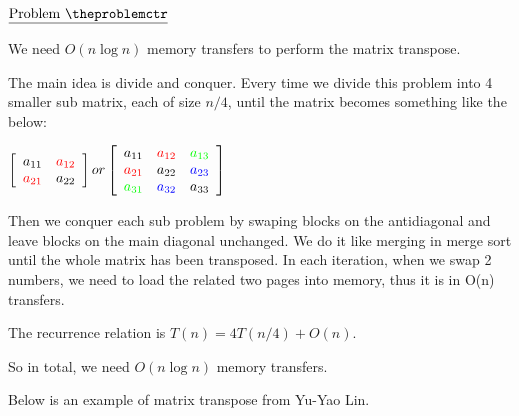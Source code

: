 \documentclass[11pt]{article}
\def\pp{\par\noindent}
\begin{document}
\vfill
\newpage
\addtocounter{problemctr}{1}
\bigskip
\noindent
$\underline{\rm Problem\ \theproblemctr}$\pp

We need $O(n\log n)$ memory transfers to perform the matrix transpose.

The main idea is divide and conquer. Every time we divide this problem into 4 smaller sub matrix, each of size $n/4$, until the matrix becomes something like the below:

\medskip
$\left[
\begin{array}{cccc}
a_{11} & \textcolor{red}{a_{12}} \\
\textcolor{red}{a_{21}} & a_{22} \\
\end{array}
\right] 
or
\left[
\begin{array}{cccc}
a_{11} & \textcolor{red}{a_{12}} & \textcolor{green}{a_{13}} \\
\textcolor{red}{a_{21}} & a_{22} & \textcolor{blue}{a_{23}} \\
\textcolor{green}{a_{31}} & \textcolor{blue}{a_{32}} & a_{33} \\
\end{array}
\right]
$
\medskip

Then we conquer each sub problem by swaping blocks on the antidiagonal and leave blocks on the main diagonal unchanged. We do it like merging in merge sort until the whole matrix has been transposed. In each iteration, when we swap 2 numbers, we need to load the related two pages into memory, thus it is in O(n) transfers.

The recurrence relation is $T(n) = 4T(n/4)+O(n)$.

So in total, we need $O(n\log n)$ memory transfers.

Below is an example of matrix transpose from Yu-Yao Lin.
\medskip
\end{document}
